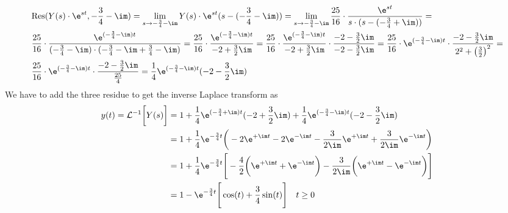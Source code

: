 \begin{align}
&	\mathrm{Res}(Y(s)\cdot\e^{st},-\frac{3}{4}-\im)=\lim\limits_{s\rightarrow -\frac{3}{4}-\im}Y(s)\cdot\e^{st}(s-(-\frac{3}{4}-\im))=\lim\limits_{s\rightarrow -\frac{3}{4}-\im}\frac{25}{16}\cdot\frac{\e^{st}}{s\cdot(s-(-\frac{3}{4}+\im))} = \nonumber \\
& \frac{25}{16}\cdot\frac{\e^{(-\frac{3}{4}-\im)t}}{(-\frac{3}{4}-\im)\cdot(-\frac{3}{4}-\im+\frac{3}{4}-\im)}=\frac{25}{16}\cdot\frac{\e^{(-\frac{3}{4}-\im)t}}{-2+\frac{3}{2}\im}=\frac{25}{16}\cdot\frac{\e^{(-\frac{3}{4}-\im)t}}{-2+\frac{3}{2}\im}\cdot\frac{-2-\frac{3}{2}\im}{-2-\frac{3}{2}\im}=\frac{25}{16}\cdot\e^{(-\frac{3}{4}-\im)t}\cdot\frac{-2-\frac{3}{2}\im}{2^2+\big (\frac{3}{2}\big)^2}=\nonumber \\
& \frac{25}{16}\cdot\e^{(-\frac{3}{4}-\im)t}\cdot\frac{-2-\frac{3}{2}\im}{\frac{25}{4}}=\frac{1}{4}\e^{(-\frac{3}{4}-\im)t}(-2-\frac{3}{2}\im)
\end{align}
We have to add the three residue to get the inverse Laplace transform as
\begin{align}
	y(t) = \mathcal{L}^{-1}\bigg [Y(s) \bigg]&=1+\frac{1}{4}\e^{(-\frac{3}{4}+\im)t}(-2+\frac{3}{2}\im)+\frac{1}{4}\e^{(-\frac{3}{4}-\im)t}(-2-\frac{3}{2}\im)\nonumber \\
	&=1+\frac{1}{4}\e^{-\frac{3}{4}t}\bigg (-2\e^{+\im t}-2\e^{-\im t}-\frac{3}{2\im}\e^{+\im t}+\frac{3}{2\im}\e^{-\im t}\bigg )\nonumber \\
	&= 1+\frac{1}{4}\e^{-\frac{3}{4}t}\Bigg [-\frac{4}{2}\bigg (\e^{+\im t}+\e^{-\im t}\bigg )-\frac{3}{2\im}\bigg (\e^{+\im t}-\e^{-\im t} \bigg )\Bigg ] \nonumber \\
	&=1-\e^{-\frac{3}{4}t}\Bigg [\cos(t)+\frac{3}{4}\sin(t) \Bigg ] \quad t \geq 0
\end{align}
